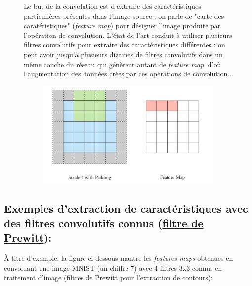 \documentclass{article}
\begin{document}
\begin{figure}[H]
\begin{minipage}[c]{0.4\linewidth}

Le but de la convolution est d'extraire des caractéristiques particulières présentes
dans l'image source : on parle de "carte des caratéristiques" (\textit{feature map}) 
pour désigner l'image produite par l'opération de convolution. 
L'état de l'art conduit à utiliser plusieurs filtres convolutifs 
pour extraire des caractéristiques différentes : on peut avoir jusqu'à 
plusieurs dizaines de filtres convolutifs dans un même couche du réseau 
qui génèrent autant de \textit{feature map}, d'où l'augmentation des données crées
par ces opérations de convolution...

\end{minipage} \hfill
\begin{minipage}[c]{0.6\linewidth}

\begin{figure}[H]
\centering
\includegraphics[width=1\textwidth]{img/conv.png}
\end{figure}

\end{minipage}
\end{figure}


\subsection{Exemples d'extraction de caractéristiques avec des filtres convolutifs 
connus (\href{https://fr.wikipedia.org/wiki/Filtre_de_Prewitt}{filtre de Prewitt}):}

À titre d'exemple, la figure ci-dessous montre les \textit{features maps} obtenues en 
convoluant une image MNIST (un chiffre 7) avec 4 filtres 3x3 connus en traitement d'image
(filtres de Prewitt pour l'extraction de contours):
\end{document}
